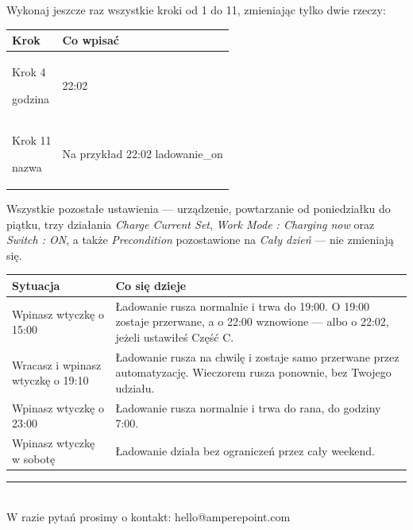 \documentclass[11pt]{article}
\begin{document}
\vspace{0.2cm}
Wykonaj jeszcze raz wszystkie kroki od 1 do 11, zmieniając tylko dwie rzeczy:

\vspace{0.3cm}
\begin{tabularx}{\textwidth}{@{}p{3.2cm}X@{}}
\toprule
\textbf{\color{apnavy}Krok} & \textbf{\color{apnavy}Co wpisać}\\
\midrule
Krok 4 \par {\footnotesize godzina} & 22:02\\
Krok 11 \par {\footnotesize nazwa} & Na przykład 22:02 ladowanie\_on\\
\bottomrule
\end{tabularx}

\vspace{0.2cm}
Wszystkie pozostałe ustawienia — urządzenie, powtarzanie od poniedziałku do piątku, trzy działania \emph{Charge Current Set}, \emph{Work Mode : Charging now} oraz \emph{Switch : ON}, a także \emph{Precondition} pozostawione na \emph{Cały dzień} — nie zmieniają się.


\clearpage
{}

\vspace{0.2cm}
\begin{tabularx}{\textwidth}{@{}p{4.4cm}X@{}}
\toprule
\textbf{\color{apnavy}Sytuacja} & \textbf{\color{apnavy}Co się dzieje}\\
\midrule
Wpinasz wtyczkę o 15:00 & Ładowanie rusza normalnie i trwa do 19:00. O 19:00 zostaje przerwane, a o 22:00 wznowione — albo o 22:02, jeżeli ustawiłeś Część C.\\
Wracasz i wpinasz wtyczkę o 19:10 & Ładowanie rusza na chwilę i zostaje samo przerwane przez automatyzację. Wieczorem rusza ponownie, bez Twojego udziału.\\
Wpinasz wtyczkę o 23:00 & Ładowanie rusza normalnie i trwa do rana, do godziny 7:00.\\
Wpinasz wtyczkę w sobotę & Ładowanie działa bez ograniczeń przez cały weekend.\\
\bottomrule
\end{tabularx}


\vspace{0.6cm}
{\color{apline}\rule{\textwidth}{0.8pt}}\\[0.15cm]
{\footnotesize\color{apmuted} W razie pytań prosimy o kontakt: hello@amperepoint.com}
\end{document}
